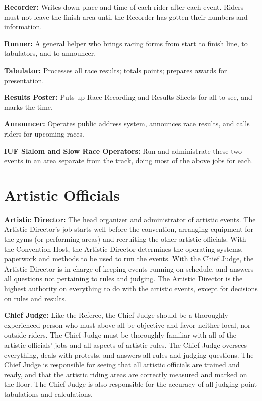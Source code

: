 \textbf{Recorder:} Writes down place and time of each rider after each event.
Riders must not leave the finish area until the Recorder has gotten their numbers and information.

\textbf{Runner:} A general helper who brings racing forms from start to finish line, to tabulators, and to announcer.

\textbf{Tabulator:} Processes all race results; totals points; prepares awards for presentation.

\textbf{Results Poster:} Puts up Race Recording and Results Sheets for all to see, and marks the time.

\textbf{Announcer:} Operates public address system, announces race results, and calls riders for upcoming races.

\textbf{IUF Slalom and Slow Race Operators:} Run and administrate these two events in an area separate from the track, doing most of the above jobs for each.

\section{Artistic Officials}
\textbf{Artistic Director:} The head organizer and administrator of artistic events.
The Artistic Director's job starts well before the convention, arranging equipment for the gyms (or performing areas) and recruiting the other artistic officials.
With the Convention Host, the Artistic Director determines the operating systems, paperwork and methods to be used to run the events.
With the Chief Judge, the Artistic Director is in charge of keeping events running on schedule, and answers all questions not pertaining to rules and judging.
The Artistic Director is the highest authority on everything to do with the artistic events, except for decisions on rules and results.

\textbf{Chief Judge:} Like the Referee, the Chief Judge should be a thoroughly experienced person who must above all be objective and favor neither local, nor outside riders.
The Chief Judge must be thoroughly familiar with all of the artistic officials' jobs and all aspects of artistic rules.
The Chief Judge oversees everything, deals with protests, and answers all rules and judging questions.
The Chief Judge is responsible for seeing that all artistic officials are trained and ready, and that the artistic riding areas are correctly measured and marked on the floor.
The Chief Judge is also responsible for the accuracy of all judging point tabulations and calculations.

